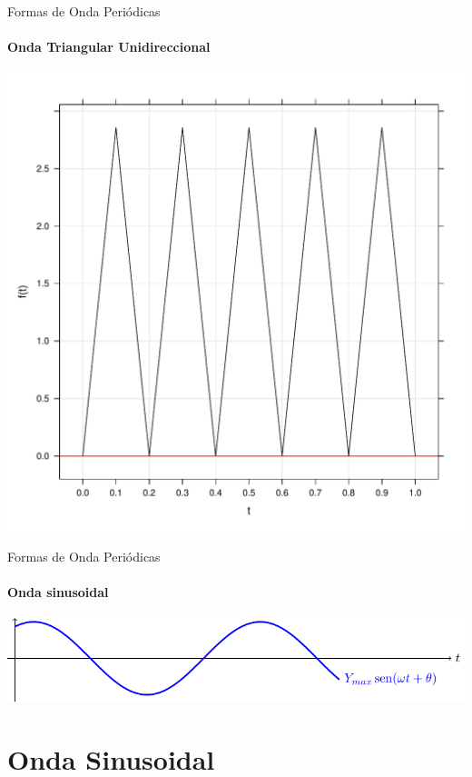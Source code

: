 \documentclass[aspectratio=169, usenames,svgnames,dvipsnames]{beamer}
\begin{document}
\begin{frame}[label={sec:org4e8af45}]{Formas de Onda Periódicas}
\framesubtitle{Onda Triangular Unidireccional}
\begin{center}
\includegraphics[height=0.9\textheight]{../figs/triangular0_periodica.pdf}
\end{center}
\end{frame}
\begin{frame}[label={sec:orgb40b3c8}]{Formas de Onda Periódicas}
\framesubtitle{Onda sinusoidal}

\begin{center}
\includegraphics[width=.9\linewidth]{../figs/sin.pdf}
\end{center}
\end{frame}
\section{Onda Sinusoidal}
\label{sec:org8004c59}
\end{document}
